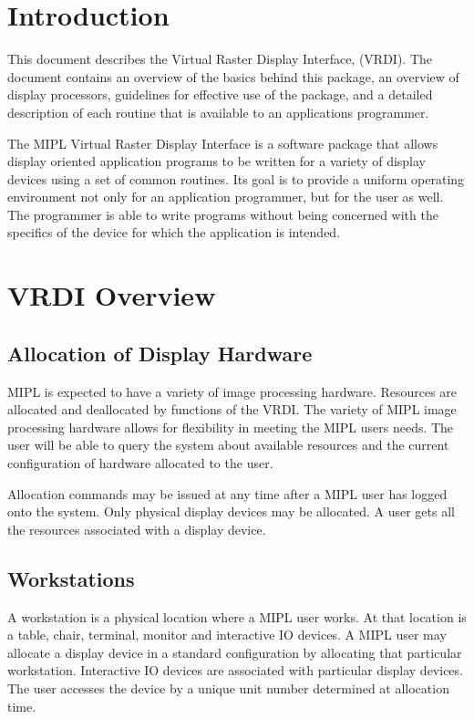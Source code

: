 \setlength{\parindent}{0em}
\setlength{\parskip}{1ex}
\setlength{\headsep}{4ex}
\setlength{\topmargin}{0ex}
\pagestyle{barheading}

\tableofcontents
\newpage
{}
\setcounter{page}{1}
\section{Introduction}
This document describes the Virtual Raster Display Interface, (VRDI).  
The document contains an overview of the basics behind this package,
an overview of display processors, guidelines for effective use of
the package, and a detailed description of each routine that is
available to an applications programmer.

The MIPL Virtual Raster Display Interface is a software package that
allows display oriented application programs to be written for a
variety of display devices using a set of common routines.  Its goal
is to provide a uniform operating environment not only for an
application programmer, but for the user as well.  The programmer is
able to write programs without being concerned with the
specifics of the device for which the application is intended.
\cleardoublepage
\section{VRDI Overview}
\subsection{Allocation of Display Hardware}
MIPL is expected to have a variety of image processing hardware.
Resources are allocated and
deallocated by functions of the VRDI.  The variety of MIPL image
processing hardware allows for flexibility in meeting the MIPL users
needs.  The user will be able to query the system about
available resources and the current configuration of hardware
allocated to the user.

Allocation commands may be issued at any time after a MIPL user has
logged onto the system.  Only physical display devices may be
allocated.  A user gets all the resources associated with a display device.
\subsection{Workstations}
A workstation is a physical location where a MIPL user
works.  At that location is a table, chair, terminal,
monitor and interactive IO devices.  A MIPL user may allocate
a display device in a standard configuration by allocating that 
particular workstation.  
Interactive IO devices are associated with particular
display devices.
The user accesses the device by a unique unit number determined at
allocation time.
